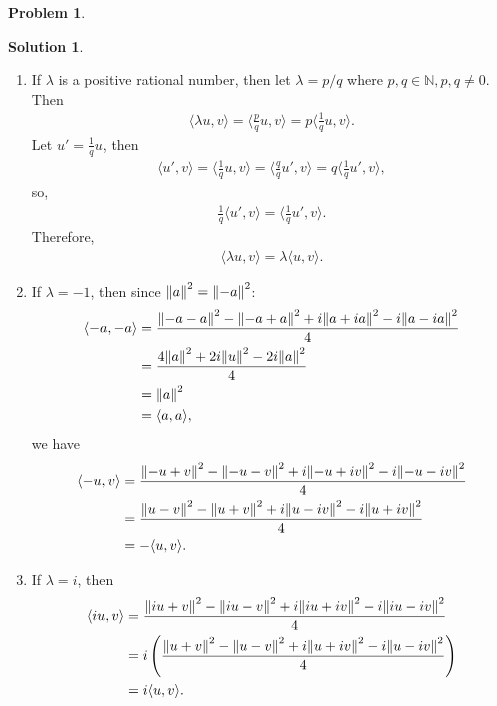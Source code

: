 \documentclass{article}
\theoremstyle{definition}
\newtheorem*{prob*}{Problem}
\newtheorem*{sln*}{Solution}
\newcommand{\la}{\langle}
\newcommand{\ra}{\rangle}
\begin{document}
\begin{prob*}
\begin{enumerate}
\begin{sln*}
\begin{enumerate}
\begin{enumerate}
					\item If $\lambda$ is a positive rational number, then let $\lambda = p/q$ where $p,q \in \mathbb{N}, p,q\neq 0$. Then
					\begin{align*}
					\la \lambda u,v \ra = \bigg\la \frac{p}{q}u,v \bigg\ra = p\bigg\la \frac{1}{q}u,v \bigg\ra.
					\end{align*}
					Let $u' = \frac{1}{q}u$, then
					\begin{align*}
					\bigg\la u',v\bigg\ra = \bigg\la \frac{1}{q}u,v \bigg\ra = \bigg\la \frac{q}{q} u',v\bigg\ra = q  \bigg\la \frac{1}{q}u',v \bigg\ra,
					\end{align*}
					so,
					\begin{align*}
					\frac{1}{q}\bigg\la u',v\bigg\ra = \bigg\la \frac{1}{q}u',v \bigg\ra.
					\end{align*}
					Therefore,
					\begin{align*}
					\la \lambda u,v \ra = \lambda \la u,v\ra.
					\end{align*}
					
					\item If $\lambda = -1$, then since $\norm{a}^2 = \norm{-a}^2$:
					\begin{align*}
					\la -a,-a\ra 
					&= \frac{\norm{-a-a}^2 - \norm{-a+a}^2 +i\norm{a+ia}^2 - i\norm{a-ia}^2}{4}\\
					&= \frac{4\norm{a}^2 + 2i\norm{u}^2 - 2i\norm{a}^2}{4}\\
					&= \norm{a}^2\\
					&= \la a,a\ra,
					\end{align*}
					we have
					\begin{align*}
					\la -u,v\ra &= \frac{\norm{-u+v}^2 - \norm{-u-v}^2 +i\norm{-u+iv}^2 - i\norm{-u-iv}^2}{4}\\
					&= \frac{\norm{u-v}^2 - \norm{u+v}^2 +i\norm{u-iv}^2 - i\norm{u+iv}^2}{4}\\
					&= - \la u,v \ra.
					\end{align*}
					\item If $\lambda = i$, then
					\begin{align*}
					\la iu,v \ra 
					&= \frac{\norm{iu+v}^2 - \norm{iu-v}^2 +i\norm{iu+iv}^2 - i\norm{iu-iv}^2}{4}\\
					&= i \left(\frac{\norm{u+v}^2 - \norm{u-v}^2 +i\norm{u+iv}^2 - i\norm{u-iv}^2}{4}\right)\\
					&= i\la u,v\ra.
					\end{align*}
					

\end{enumerate}
\end{enumerate}
\end{sln*}
\end{enumerate}
\end{prob*}
\end{document}
